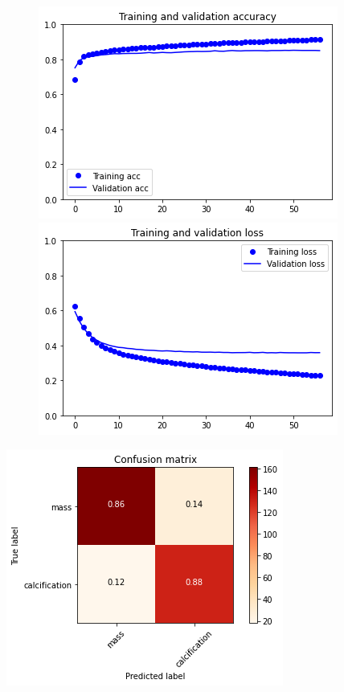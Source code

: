 \documentclass{article}
\begin{document}
\begin{figure}[h]
    \centering
    \begin{minipage}{0.45\textwidth}
        \centering
        \includegraphics[scale=0.46]{./img/preTrainValInception_ft.png}
    \end{minipage}\hfill
    \begin{minipage}{0.45\textwidth}
        \centering
        \includegraphics[scale=0.46]{./img/preTrainLossInception_ft.png}
    \end{minipage}
\end{figure}

\begin{center}
\begin{minipage}{0.45\textwidth}
        \includegraphics[scale=0.6]{./img/cmPreTrainInception_ft.png}
    \end{minipage}
\end{center}
\end{document}
